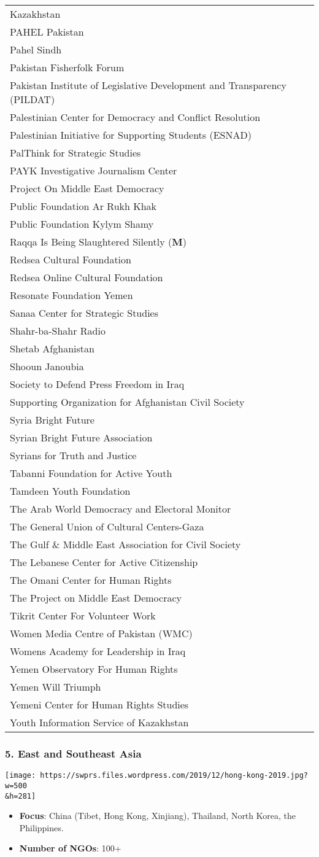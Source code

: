 \begin{longtable}[]{@{}l@{}}
Kazakhstan\tabularnewline
PAHEL Pakistan\tabularnewline
Pahel Sindh\tabularnewline
Pakistan Fisherfolk Forum\tabularnewline
Pakistan Institute of Legislative Development and Transparency
(PILDAT)\tabularnewline
Palestinian Center for Democracy and Conflict Resolution\tabularnewline
Palestinian Initiative for Supporting Students (ESNAD)\tabularnewline
PalThink for Strategic Studies\tabularnewline
PAYK Investigative Journalism Center\tabularnewline
Project On Middle East Democracy\tabularnewline
Public Foundation Ar Rukh Khak\tabularnewline
Public Foundation Kylym Shamy\tabularnewline
Raqqa Is Being Slaughtered Silently (\textbf{M})\tabularnewline
Redsea Cultural Foundation\tabularnewline
Redsea Online Cultural Foundation\tabularnewline
Resonate Foundation Yemen\tabularnewline
Sanaa Center for Strategic Studies\tabularnewline
Shahr-ba-Shahr Radio\tabularnewline
Shetab Afghanistan\tabularnewline
Shooun Janoubia\tabularnewline
Society to Defend Press Freedom in Iraq\tabularnewline
Supporting Organization for Afghanistan Civil Society\tabularnewline
Syria Bright Future\tabularnewline
Syrian Bright Future Association\tabularnewline
Syrians for Truth and Justice\tabularnewline
Tabanni Foundation for Active Youth\tabularnewline
Tamdeen Youth Foundation\tabularnewline
The Arab World Democracy and Electoral Monitor\tabularnewline
The General Union of Cultural Centers-Gaza\tabularnewline
The Gulf \& Middle East Association for Civil Society\tabularnewline
The Lebanese Center for Active Citizenship\tabularnewline
The Omani Center for Human Rights\tabularnewline
The Project on Middle East Democracy\tabularnewline
Tikrit Center For Volunteer Work\tabularnewline
Women Media Centre of Pakistan (WMC)\tabularnewline
Womens Academy for Leadership in Iraq\tabularnewline
Yemen Observatory For Human Rights\tabularnewline
Yemen Will Triumph\tabularnewline
Yemeni Center for Human Rights Studies\tabularnewline
Youth Information Service of Kazakhstan\tabularnewline
\bottomrule
\end{longtable}

\hypertarget{5-east-and-southeast-asia}{%
\subsubsection{5. East and Southeast
Asia}\label{5-east-and-southeast-asia}}

\texttt{[image: https://swprs.files.wordpress.com/2019/12/hong-kong-2019.jpg?w=500\\\&h=281]}

\begin{itemize}
\tightlist
\item
  \textbf{Focus}: China (Tibet, Hong Kong, Xinjiang), Thailand, North
  Korea, the Philippines.
\item
  \textbf{Number of NGOs}: 100+
\end{itemize}

